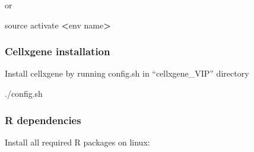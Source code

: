 \documentclass[
]{article}
\newenvironment{Shaded}{\begin{snugshade}}{\end{snugshade}}
\newcommand{\BuiltInTok}[1]{#1}
\newcommand{\ExtensionTok}[1]{#1}
\newcommand{\NormalTok}[1]{#1}
\newcommand{\OperatorTok}[1]{\textcolor[rgb]{0.81,0.36,0.00}{\textbf{#1}}}
\begin{document}
or

\begin{Shaded}
\begin{Highlighting}[]
\BuiltInTok{source}\NormalTok{ activate }\OperatorTok{\textless{}}\NormalTok{env name}\OperatorTok{\textgreater{}}
\end{Highlighting}
\end{Shaded}

\hypertarget{cellxgene-installation}{%
\subsubsection{Cellxgene installation}\label{cellxgene-installation}}

Install cellxgene by running config.sh in ``cellxgene\_VIP'' directory

\begin{Shaded}
\begin{Highlighting}[]
\ExtensionTok{./config.sh}
\end{Highlighting}
\end{Shaded}

\hypertarget{r-dependencies}{%
\subsubsection{R dependencies}\label{r-dependencies}}

Install all required R packages on linux:
\end{document}
